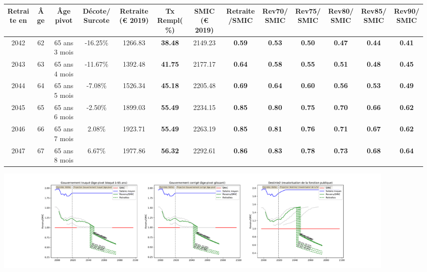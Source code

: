 { \scriptsize \begin{center} 
\begin{tabular}[htb]{|c|c||c|c||c|c||c||c|c|c|c|c|c|} 
\hline 
 Retraite en &  Âge &  Âge pivot &  Décote/Surcote &  Retraite (\euro{} 2019) &  Tx Rempl(\%) &  SMIC (\euro{} 2019) &  Retraite/SMIC &  Rev70/SMIC &  Rev75/SMIC &  Rev80/SMIC &  Rev85/SMIC &  Rev90/SMIC \\ 
\hline \hline 
 2042 &  62 &  65 ans 3 mois &  -16.25\% &  1266.83 &  {\bf 38.48} &  2149.23 &  {\bf {\color{red} 0.59}} &  {\bf {\color{red} 0.53}} &  {\bf {\color{red} 0.50}} &  {\bf {\color{red} 0.47}} &  {\bf {\color{red} 0.44}} &  {\bf {\color{red} 0.41}} \\ 
\hline 
 2043 &  63 &  65 ans 4 mois &  -11.67\% &  1392.48 &  {\bf 41.75} &  2177.17 &  {\bf {\color{red} 0.64}} &  {\bf {\color{red} 0.58}} &  {\bf {\color{red} 0.55}} &  {\bf {\color{red} 0.51}} &  {\bf {\color{red} 0.48}} &  {\bf {\color{red} 0.45}} \\ 
\hline 
 2044 &  64 &  65 ans 5 mois &  -7.08\% &  1526.34 &  {\bf 45.18} &  2205.48 &  {\bf {\color{red} 0.69}} &  {\bf {\color{red} 0.64}} &  {\bf {\color{red} 0.60}} &  {\bf {\color{red} 0.56}} &  {\bf {\color{red} 0.53}} &  {\bf {\color{red} 0.49}} \\ 
\hline 
 2045 &  65 &  65 ans 6 mois &  -2.50\% &  1899.03 &  {\bf 55.49} &  2234.15 &  {\bf {\color{red} 0.85}} &  {\bf {\color{red} 0.80}} &  {\bf {\color{red} 0.75}} &  {\bf {\color{red} 0.70}} &  {\bf {\color{red} 0.66}} &  {\bf {\color{red} 0.62}} \\ 
\hline 
 2046 &  66 &  65 ans 7 mois &  2.08\% &  1923.71 &  {\bf 55.49} &  2263.19 &  {\bf {\color{red} 0.85}} &  {\bf {\color{red} 0.81}} &  {\bf {\color{red} 0.76}} &  {\bf {\color{red} 0.71}} &  {\bf {\color{red} 0.67}} &  {\bf {\color{red} 0.62}} \\ 
\hline 
 2047 &  67 &  65 ans 8 mois &  6.67\% &  1977.86 &  {\bf 56.32} &  2292.61 &  {\bf {\color{red} 0.86}} &  {\bf {\color{red} 0.83}} &  {\bf {\color{red} 0.78}} &  {\bf {\color{red} 0.73}} &  {\bf {\color{red} 0.68}} &  {\bf {\color{red} 0.64}} \\ 
\hline 
\hline 
\end{tabular} 
\end{center} } 

 \begin{center}\includegraphics[width=0.9\textwidth]{fig/AideSoignant_1980_22_dest_retraite.pdf}\end{center} \label{fig/AideSoignant_1980_22_dest_retraite.pdf} 

